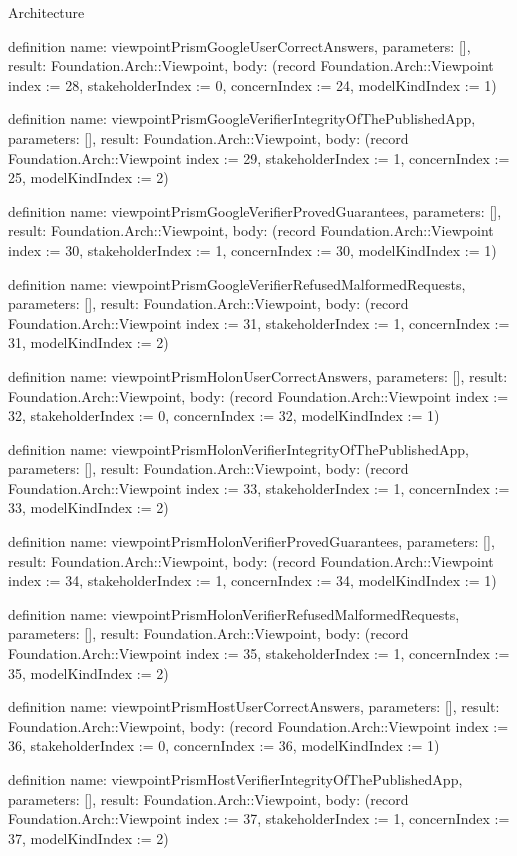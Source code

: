 \begin{lexlean}{Architecture}
\begin{semanticmodule}
definition{
  name: viewpointPrismGoogleUserCorrectAnswers,
  parameters: [],
  result: Foundation.Arch::Viewpoint,
  body: (record Foundation.Arch::Viewpoint {index := 28, stakeholderIndex := 0, concernIndex := 24, modelKindIndex := 1})
}

definition{
  name: viewpointPrismGoogleVerifierIntegrityOfThePublishedApp,
  parameters: [],
  result: Foundation.Arch::Viewpoint,
  body: (record Foundation.Arch::Viewpoint {index := 29, stakeholderIndex := 1, concernIndex := 25, modelKindIndex := 2})
}

definition{
  name: viewpointPrismGoogleVerifierProvedGuarantees,
  parameters: [],
  result: Foundation.Arch::Viewpoint,
  body: (record Foundation.Arch::Viewpoint {index := 30, stakeholderIndex := 1, concernIndex := 30, modelKindIndex := 1})
}

definition{
  name: viewpointPrismGoogleVerifierRefusedMalformedRequests,
  parameters: [],
  result: Foundation.Arch::Viewpoint,
  body: (record Foundation.Arch::Viewpoint {index := 31, stakeholderIndex := 1, concernIndex := 31, modelKindIndex := 2})
}

definition{
  name: viewpointPrismHolonUserCorrectAnswers,
  parameters: [],
  result: Foundation.Arch::Viewpoint,
  body: (record Foundation.Arch::Viewpoint {index := 32, stakeholderIndex := 0, concernIndex := 32, modelKindIndex := 1})
}

definition{
  name: viewpointPrismHolonVerifierIntegrityOfThePublishedApp,
  parameters: [],
  result: Foundation.Arch::Viewpoint,
  body: (record Foundation.Arch::Viewpoint {index := 33, stakeholderIndex := 1, concernIndex := 33, modelKindIndex := 2})
}

definition{
  name: viewpointPrismHolonVerifierProvedGuarantees,
  parameters: [],
  result: Foundation.Arch::Viewpoint,
  body: (record Foundation.Arch::Viewpoint {index := 34, stakeholderIndex := 1, concernIndex := 34, modelKindIndex := 1})
}

definition{
  name: viewpointPrismHolonVerifierRefusedMalformedRequests,
  parameters: [],
  result: Foundation.Arch::Viewpoint,
  body: (record Foundation.Arch::Viewpoint {index := 35, stakeholderIndex := 1, concernIndex := 35, modelKindIndex := 2})
}

definition{
  name: viewpointPrismHostUserCorrectAnswers,
  parameters: [],
  result: Foundation.Arch::Viewpoint,
  body: (record Foundation.Arch::Viewpoint {index := 36, stakeholderIndex := 0, concernIndex := 36, modelKindIndex := 1})
}

definition{
  name: viewpointPrismHostVerifierIntegrityOfThePublishedApp,
  parameters: [],
  result: Foundation.Arch::Viewpoint,
  body: (record Foundation.Arch::Viewpoint {index := 37, stakeholderIndex := 1, concernIndex := 37, modelKindIndex := 2})
}


\end{semanticmodule}
\end{lexlean}
